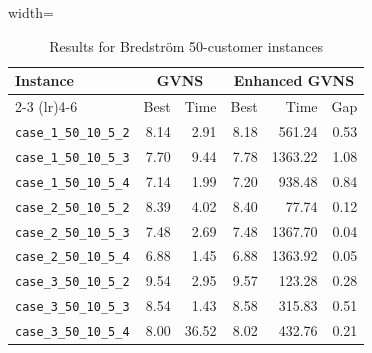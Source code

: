 \documentclass{article}
\begin{document}
\begin{table}[h]
\centering
\small
\setlength{\tabcolsep}{3pt}
\caption{Results for Bredström 50-customer instances}
\vspace{4mm}
\begin{adjustbox}{width=\textwidth}
\begin{tabular}{l r r @{\hspace{4pt}} r r r}
\toprule
\multirow{2}{*}{Instance} & \multicolumn{2}{c}{GVNS} & \multicolumn{3}{c}{Enhanced GVNS} \\
\cmidrule(lr){2-3} \cmidrule(lr){4-6}
 & Best & Time & Best & Time & Gap \\
\midrule
\texttt{case\_1\_50\_10\_5\_2} & 8.14 & 2.91 & 8.18 & 561.24 & 0.53 \\
\texttt{case\_1\_50\_10\_5\_3} & 7.70 & 9.44 & 7.78 & 1363.22 & 1.08 \\
\texttt{case\_1\_50\_10\_5\_4} & 7.14 & 1.99 & 7.20 & 938.48 & 0.84 \\
\texttt{case\_2\_50\_10\_5\_2} & 8.39 & 4.02 & 8.40 & 77.74 & 0.12 \\
\texttt{case\_2\_50\_10\_5\_3} & 7.48 & 2.69 & 7.48 & 1367.70 & 0.04 \\
\texttt{case\_2\_50\_10\_5\_4} & 6.88 & 1.45 & 6.88 & 1363.92 & 0.05 \\
\texttt{case\_3\_50\_10\_5\_2} & 9.54 & 2.95 & 9.57 & 123.28 & 0.28 \\
\texttt{case\_3\_50\_10\_5\_3} & 8.54 & 1.43 & 8.58 & 315.83 & 0.51 \\
\texttt{case\_3\_50\_10\_5\_4} & 8.00 & 36.52 & 8.02 & 432.76 & 0.21 \\
\bottomrule
\end{tabular}
\end{adjustbox}
\end{table}
\end{document}
